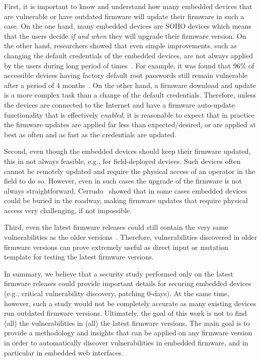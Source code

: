 \documentclass[conference]{./templates/ndss/IEEEtran}
\newcounter{t0d0_counter}
\newcounter{pr00f_counter}
\begin{document}
    First, it is important to know and understand how many embedded devices 
that are vulnerable or have outdated firmware will update their firmware 
in such a case. 
On the one hand, many embedded devices are SOHO devices which means that the 
users decide \textit{if and when} they will upgrade their firmware version. 
On the other hand, researchers showed that even simple improvements, 
such as changing the default credentials of the embedded devices, are 
not always applied by the users during long period of times~\cite{ghena2014green}. 
For example, it was found that 96\% of accessible devices 
having factory default root passwords still remain vulnerable after 
a period of 4 months~\cite{cui-acsac2010-QuantAnalysInsecEmbDev}. 
On the other hand, a firmware download and update is a more complex task 
than a change of the default credentials. 
Therefore, unless the devices are connected to the Internet and have 
a firmware auto-update functionality that is effectively \emph{enabled}, it 
is reasonable to expect that in practice the firmware updates are applied far 
less than expected/desired, or are applied at best as often and as fast as 
the credentials are updated. 

    Second, even though the embedded devices should keep their firmware 
updated, this in not always feasible, e.g., for field-deployed devices. 
Such devices often cannot be remotely updated and require the physical 
access of an operator in the field to do so. However, even in such cases 
the upgrade of the firmware is not always straightforward. 
Cerrudo~\cite{cerrudo2014hacking} showed that in some cases embedded 
devices could be buried in the roadway, making firmware updates that 
require physical access very challenging, if not impossible. 

    Third, even the latest firmware releases could still contain 
the very same vulnerabilities as the older versions~\cite{cui-ndss2013-FirmwareModAttacks-old}. 
Therefore, vulnerabilities discovered in older firmware versions can 
prove extremely useful as direct input or mutation template for testing 
the latest firmware versions. 

In summary, we believe that a security study performed only on the 
latest firmware releases could provide important details for securing 
embedded devices (e.g., critical vulnerability discovery, patching 0-days). 
At the same time, however, such a study would not be completely accurate 
as many existing devices run outdated firmware versions. 
Ultimately, the goal of this work is not to find (all) the vulnerabilities 
in (all) the latest firmware versions. The main goal is to provide 
a methodology and insights that can be applied on any firmware version 
in order to automatically discover vulnerabilities in embedded firmware, 
and in particular in embedded web interfaces. 
\end{document}
